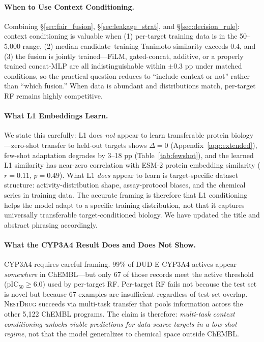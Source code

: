 \documentclass[sigconf]{acmart}
\newcommand{\methodname}{\textsc{NestDrug}}
\begin{document}
\paragraph{When to Use Context Conditioning.}
Combining \S\ref{sec:fair_fusion}, \S\ref{sec:leakage_strat}, and \S\ref{sec:decision_rule}: context conditioning is valuable when (1) per-target training data is in the 50--5{,}000 range, (2) median candidate--training Tanimoto similarity exceeds 0.4, and (3) the fusion is jointly trained---FiLM, gated-concat, additive, or a properly trained concat-MLP are all indistinguishable within $\pm 0.3$ pp under matched conditions, so the practical question reduces to ``include context or not'' rather than ``which fusion.'' When data is abundant and distributions match, per-target RF remains highly competitive.

\paragraph{What L1 Embeddings Learn.}
We state this carefully: L1 does \emph{not} appear to learn transferable protein biology---zero-shot transfer to held-out targets shows $\Delta = 0$ (Appendix~\ref{app:extended}), few-shot adaptation degrades by 3--18 pp (Table~\ref{tab:fewshot}), and the learned L1 similarity has near-zero correlation with ESM-2 protein embedding similarity ($r = 0.11$, $p = 0.49$). What L1 \emph{does} appear to learn is target-specific dataset structure: activity-distribution shape, assay-protocol biases, and the chemical series in training data. The accurate framing is therefore that L1 conditioning helps the model adapt to a specific training distribution, not that it captures universally transferable target-conditioned biology. We have updated the title and abstract phrasing accordingly.

\paragraph{What the CYP3A4 Result Does and Does Not Show.}
CYP3A4 requires careful framing. 99\% of DUD-E CYP3A4 actives appear \emph{somewhere} in ChEMBL---but only 67 of those records meet the active threshold (pIC$_{50} \geq 6.0$) used by per-target RF. Per-target RF fails not because the test set is novel but because 67 examples are insufficient regardless of test-set overlap. \methodname{} succeeds via multi-task transfer that pools information across the other 5{,}122 ChEMBL programs. The claim is therefore: \textit{multi-task context conditioning unlocks viable predictions for data-scarce targets in a low-shot regime}, not that the model generalizes to chemical space outside ChEMBL.
\end{document}
